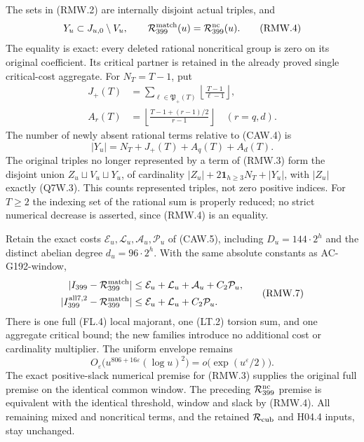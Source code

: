 \begin{theorem}
\label{AC-G196-window}
The sets in (RMW.2) are internally disjoint actual triples, and
\[
 Y_u\subset J_{u,0}\setminus V_u,\qquad
 \mathcal R_{399}^{\rm match}(u)=\mathcal R_{399}^{\rm nc}(u).
 \tag{RMW.4}
\]
The equality is exact: every deleted rational noncritical group
is zero on its original coefficient. Its critical partner is
retained in the already proved single critical-cost aggregate.
For $N_T=T-1$, put
\[
 \begin{aligned}
 J_+(T)&=\sum_{\ell\in\mathfrak P_+(T)}
                         \left\lfloor\frac{T-1}{\ell-1}\right\rfloor,\\
 A_r(T)&=\left\lfloor\frac{T-1+(r-1)/2}{r-1}\right\rfloor
                         \quad(r=q,d).
 \end{aligned}\tag{RMW.5}
\]
The number of newly absent rational terms relative to (CAW.4) is
\[
                |Y_u|=N_T+J_+(T)+A_q(T)+A_d(T).
 \tag{RMW.6}
\]
The original triples no longer represented by a term of (RMW.3)
form the disjoint union $Z_u\sqcup V_u\sqcup Y_u$, of cardinality
$|Z_u|+2\mathbf1_{h\geq3}N_T+|Y_u|$, with $|Z_u|$ exactly
(Q7W.3). This counts represented triples, not zero positive indices.
For $T\geq2$ the indexing set of the rational sum is properly reduced;
no strict numerical decrease is asserted, since (RMW.4) is an equality.

Retain the exact costs $\mathcal E_u,\mathcal L_u,\mathcal A_u,
\mathcal P_u$ of (CAW.5), including $D_u=144\cdot2^h$ and the
distinct abelian degree $d_u=96\cdot2^h$.
With the same absolute constants as AC-G192-window,
\[
 \begin{aligned}
 |I_{399}-\mathcal R_{399}^{\rm match}|&\leq
       \mathcal E_u+\mathcal L_u+\mathcal A_u+C_2\mathcal P_u,\\
 |I_{399}^{\rm all7,2}-\mathcal R_{399}^{\rm match}|&\leq
       \mathcal E_u+\mathcal L_u+C_2\mathcal P_u.
 \end{aligned}\tag{RMW.7}
\]
There is one full (FL.4) local majorant, one (LT.2) torsion sum,
and one aggregate critical bound; the new families introduce
no additional cost or cardinality multiplier.
The uniform envelope remains
\[
 O_\varepsilon\bigl(u^{806+16\varepsilon}(\log u)^2\bigr)
                   =o\bigl(\exp(u^\varepsilon/2)\bigr).
 \tag{RMW.8}
\]
The exact positive-slack numerical premise for (RMW.3) supplies
the original full premise on the identical common window.
The preceding $\mathcal R_{399}^{\rm nc}$ premise is equivalent
with the identical threshold, window and slack by (RMW.4).
All remaining mixed and noncritical terms, and the retained
$\mathcal R_{\rm cub}$ and H04.4 inputs, stay unchanged.
\end{theorem}

